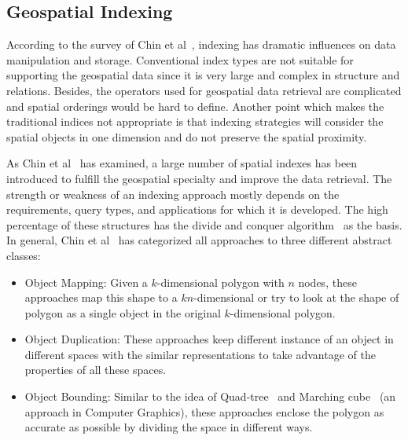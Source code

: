 \documentclass[a4paper,12pt]{article}
\begin{document}
\subsection{Geospatial Indexing}
\label{s.geospatial-index}
According to the survey of Chin et al~\cite{survey}, indexing has dramatic influences on data manipulation and storage. Conventional index types are not suitable for supporting the geospatial data since it is very large and complex in structure and relations. Besides, the operators used for geospatial data retrieval are complicated and spatial orderings would be hard to define. Another point which makes the traditional indices not appropriate is that indexing strategies will consider the spatial objects in one dimension and do not preserve the spatial proximity.

As Chin et al~\cite{survey} has examined, a large number of spatial indexes has been introduced to fulfill the geospatial specialty and improve the data retrieval. The strength or weakness of an indexing approach mostly depends on the requirements, query types, and applications for which it is developed. 
The high percentage of these structures has the divide and conquer algorithm~\cite{divconquer} as the basis. 
In general, Chin et al~\cite{survey} has categorized all approaches to three different abstract classes:
\begin{itemize}
\item Object Mapping: Given a $k$-dimensional polygon with $n$ nodes, these approaches map this shape to a $kn$-dimensional or try to look at the shape of polygon as a single object in the original $k$-dimensional polygon.   
\item Object Duplication: These approaches keep different instance of an object in different spaces with the similar representations to take advantage of the properties of all these spaces. 
\item Object Bounding: Similar to the idea of Quad-tree~\cite{quadtree} and Marching cube~\cite{marchingcube} (an approach in Computer Graphics), 
these approaches enclose the polygon as accurate as possible by dividing the space in different ways. 
\end{itemize}
\end{document}
